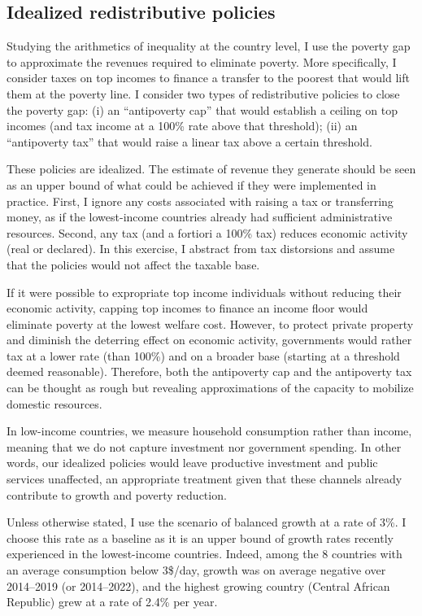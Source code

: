 \documentclass[12pt,english]{article}
\begin{document}
\subsection{Idealized redistributive policies}

Studying the arithmetics of inequality at the country level, I use the poverty gap to approximate the revenues required to eliminate poverty. 
More specifically, I consider taxes on top incomes to finance a transfer to the poorest that would lift them at the poverty line. I consider two types of redistributive policies to close the poverty gap: (i) an ``antipoverty cap'' that would establish a ceiling on top incomes (and tax income at a 100\% rate above that threshold); (ii) an ``antipoverty tax'' that would raise a linear tax above a certain threshold. 

These policies are idealized. The estimate of revenue they generate should be seen as an upper bound of what could be achieved if they were implemented in practice. 
First, I ignore any costs associated with raising a tax or transferring money, as if the lowest-income countries already had sufficient administrative resources. Second, any tax (and a fortiori a 100\% tax) reduces economic activity (real or declared). In this exercise, I abstract from tax distorsions and assume that the policies would not affect the taxable base.%

If it were possible to expropriate top income individuals 
without reducing their economic activity, capping top incomes to finance an income floor would eliminate poverty at the lowest welfare cost. 
However, to protect private property and diminish the deterring effect on economic activity, governments would rather tax at a lower rate (than 100\%) and on a broader base (starting at a threshold deemed reasonable). 
Therefore, both the antipoverty cap and the antipoverty tax can be thought as rough but revealing approximations of the capacity to mobilize domestic resources.

In low-income countries, we measure household consumption rather than income, meaning that we do not capture investment nor government spending. In other words, our idealized policies would leave productive investment and public services unaffected, an appropriate treatment given that these channels already contribute to growth and poverty reduction.%

Unless otherwise stated, I use the scenario of balanced growth at a rate of 3\%. I choose this rate as a baseline as it is an upper bound of growth rates recently experienced in the lowest-income countries. Indeed, among the 8 countries with an average consumption below 3\$/day, growth was on average negative over 2014--2019 (or 2014--2022), and the highest growing country (Central African Republic) grew at a rate of 2.4\% per year. %
\end{document}
